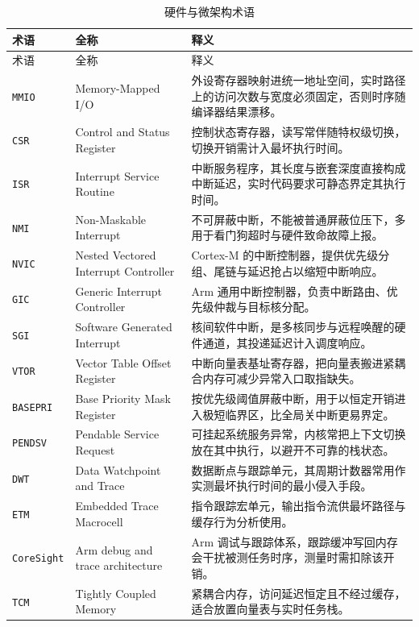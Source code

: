 \documentclass[12pt,a4paper,fontset=fandol]{ctexbook}
\newcommand{\Tp}[1]{\texttt{#1}}
\begin{document}
\begin{longtable}{@{} >{\raggedright\arraybackslash}p{} >{\raggedright\arraybackslash}p{} >{\raggedright\arraybackslash}p{}@{}}
\caption{硬件与微架构术语}\label{tab:apA-hw} \\
\toprule
术语 & 全称 & 释义 \\
\midrule
\endfirsthead
\toprule
术语 & 全称 & 释义 \\
\midrule
\endhead
\bottomrule
\endfoot
\endlastfoot
\Tp{MMIO} & Memory-Mapped I/O & 外设寄存器映射进统一地址空间，实时路径上的访问次数与宽度必须固定，否则时序随编译器结果漂移。 \\
\Tp{CSR} & Control and Status Register & 控制状态寄存器，读写常伴随特权级切换，切换开销需计入最坏执行时间。 \\
\Tp{ISR} & Interrupt Service Routine & 中断服务程序，其长度与嵌套深度直接构成中断延迟，实时代码要求可静态界定其执行时间。 \\
\Tp{NMI} & Non-Maskable Interrupt & 不可屏蔽中断，不能被普通屏蔽位压下，多用于看门狗超时与硬件致命故障上报。 \\
\Tp{NVIC} & Nested Vectored Interrupt Controller & Cortex-M 的中断控制器，提供优先级分组、尾链与延迟抢占以缩短中断响应。 \\
\Tp{GIC} & Generic Interrupt Controller & Arm 通用中断控制器，负责中断路由、优先级仲裁与目标核分配。 \\
\Tp{SGI} & Software Generated Interrupt & 核间软件中断，是多核同步与远程唤醒的硬件通道，其投递延迟计入调度响应。 \\
\Tp{VTOR} & Vector Table Offset Register & 中断向量表基址寄存器，把向量表搬进紧耦合内存可减少异常入口取指缺失。 \\
\Tp{BASEPRI} & Base Priority Mask Register & 按优先级阈值屏蔽中断，用于以恒定开销进入极短临界区，比全局关中断更易界定。 \\
\Tp{PENDSV} & Pendable Service Request & 可挂起系统服务异常，内核常把上下文切换放在其中执行，以避开不可靠的栈状态。 \\
\Tp{DWT} & Data Watchpoint and Trace & 数据断点与跟踪单元，其周期计数器常用作实测最坏执行时间的最小侵入手段。 \\
\Tp{ETM} & Embedded Trace Macrocell & 指令跟踪宏单元，输出指令流供最坏路径与缓存行为分析使用。 \\
\Tp{CoreSight} & Arm debug and trace architecture & Arm 调试与跟踪体系，跟踪缓冲写回内存会干扰被测任务时序，测量时需扣除该开销。 \\
\Tp{TCM} & Tightly Coupled Memory & 紧耦合内存，访问延迟恒定且不经过缓存，适合放置向量表与实时任务栈。 \\

\end{longtable}
\end{document}
